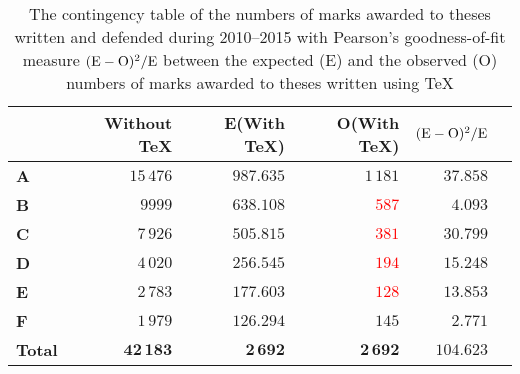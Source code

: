 \documentclass{csbulletin}
\begin{document}
{  \begin{table}
    \begin{tabularx}{\textwidth}{Xrrrrr}
      &\textbf{Without \TeX}&E(\textbf{With \TeX})
      &O(\textbf{With \TeX})&$(\rm{E}-\rm{O})^2/\rm{E}$
      \\ \toprule
      \textbf{\parbox[t]{1em}{\centering A}} 
        &$15\,476$&$987.635$&\textcolor{OliveGreen}{$1\,181$}&
        $37.858$\\
      \textbf{\parbox[t]{1em}{\centering B}}
        &$9999$&$638.108$&\textcolor{red}{$587$}&$4.093$\\
      \textbf{\parbox[t]{1em}{\centering C}}
        &$7\,926$&$505.815$&\textcolor{red}{$381$}&$30.799$\\
      \textbf{\parbox[t]{1em}{\centering D}}
        &$4\,020$&$256.545$&\textcolor{red}{$194$}&$15.248$\\
      \textbf{\parbox[t]{1em}{\centering E}}
        &$2\,783$&$177.603$&\textcolor{red}{$128$}&$13.853$\\
      \textbf{\parbox[t]{1em}{\centering F}}
        &$1\,979$&$126.294$&\textcolor{OliveGreen}{$145$}&
        $2.771$\\
      \bottomrule
      \textbf{Total} &$\mathbf{42\,183}$&$\mathbf{2\,692}$&
        $\mathbf{2\,692}$&$\mathbf{104.623}$
    \end{tabularx}
    \caption{The contingency table of the numbers of marks awarded
      to theses written and defended during 2010--2015 with
      Pearson's goodness-of-fit measure
      $(\rm{E}-\rm{O})^2/\rm{E}$ between the expected (E)
      and the observed (O) numbers of marks awarded to theses
      written using \TeX}
    \label{table:statistics-contingency}
  \end{table}

}
\end{document}

